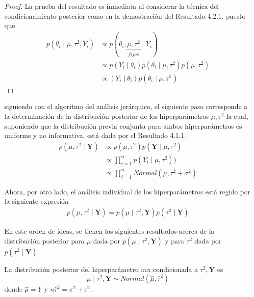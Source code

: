 \begin{proof}
La prueba del resultado es inmediata al considerar la técnica del condicionamiento posterior como en la demostración del Resultado 4.2.1. puesto que
\begin{align*}
p(\theta_i \mid \mu,\tau^2,Y_i)&\propto
p(\theta_i,\underbrace{\mu,\tau^2}_{fijos} \mid Y_i)\\
&\propto
p(Y_i \mid \theta_i)p(\theta_i \mid \mu,\tau^2)p(\mu,\tau^2)\\
&\propto
(Y_i \mid \theta_i)p(\theta_i \mid \mu,\tau^2)
\end{align*}
\end{proof}

siguiendo con el algoritmo del análisis jerárquico, el siguiente paso corresponde a la determinación de la distribución posterior de los hiperparámetros $\mu, \tau^2$ la cual, suponiendo que la distribución previa conjunta para ambos hiperparámetros es uniforme y no informativa, está dada por el Resultado 4.1.1.
\begin{align*}
p(\mu, \tau^2 \mid \mathbf{Y})&\propto p(\mu,\tau^2)p(\mathbf{Y} \mid \mu,\tau^2)\\
&\propto \prod_{i=1}^n p(Y_i \mid \mu,\tau^2))\\
&\propto \prod_{i=1}^n Normal(\mu,\tau^2+\sigma^2)
\end{align*}

Ahora, por otro lado, el análisis individual de los hiperparámetros está regido por la siguiente expresión
\begin{align*}
p(\mu, \tau^2 \mid \mathbf{Y})=p(\mu \mid  \tau^2,\mathbf{Y})p(\tau^2 \mid \mathbf{Y})
\end{align*}

En este orden de ideas, se tienen los siguientes resultados acerca de la distribución posterior para $\mu$ dada por $p(\mu \mid  \tau^2,\mathbf{Y})$ y para $\tau^2$ dada por $p(\tau^2 \mid \mathbf{Y})$

\begin{Res}
La distribución posterior del hiperparámetro $mu$ condicionada a $\tau^2,\mathbf{Y}$ es
\begin{equation*}
\mu \mid \tau^2,\mathbf{Y} \sim Normal \left(\hat{\mu},\hat{\tau}^2\right)
\end{equation*}
donde $\hat{\mu}=\bar{Y}$ y $n\hat{\tau}^2=\sigma^2+\tau^2$.
\end{Res}

